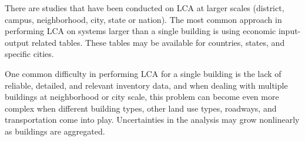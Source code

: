\documentclass[10pt]{article}
\begin{document}
There are studies that have been conducted on LCA at larger scales (district, campus, neighborhood, city, state or nation). The most common approach in performing LCA on systems larger than a single building is using economic input-output related tables. These tables may be available for countries, states, and specific cities. 

One common difficulty in performing LCA for a single building is the lack of reliable, detailed, and relevant inventory data, and when dealing with multiple buildings at neighborhood or city scale, this problem can become even more complex when different building types, other land use types, roadways, and transportation come into play. Uncertainties in the analysis may grow nonlinearly as buildings are aggregated. 





\end{document}
